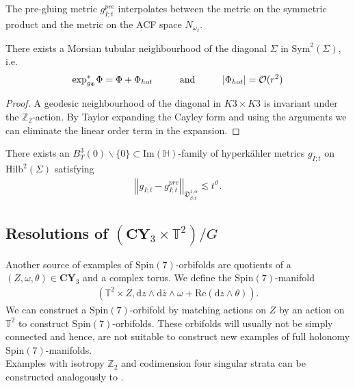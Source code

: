 \documentclass[psamsfonts]{amsart}
\theoremstyle{plain}
\theoremstyle{definition}{
\newtheorem{defi}{Definition}[section]
\newtheorem{ass}{Assumption}
\newtheorem*{nota}{Notation}}
\theoremstyle{remark}{
\newtheorem{rem}{Remark}
\newtheorem{ex}{Example}}
\theoremstyle{plain}{
\newtheorem{thm}{Theorem}[section]
\newtheorem{lem}{Lemma}[section]
\newtheorem{cor}{Corollary}[section]
\newtheorem{prop}{Proposition}[section]
\newtheorem{con}{Conjecture}[section]}
\newcommand{\m}[1]{{\mathrm{#1}}}
\newcommand{\cat}[1]{\textbf{#1}}
\newcommand{\und}[1]{\hspace{#1}\text{and}\hspace{#1}}
\begin{document}
The pre-gluing metric $g^{pre}_{I;t}$ interpolates between the metric on the symmetric product and the metric on the ACF space $N_{\omega_I}$.

\begin{prop}\cite[Cor. 3.9]{joyce2017new}
There exists a Morsian tubular neighbourhood of the diagonal $\Sigma$ in $\m{Sym}^2(\Sigma)$, i.e.
\begin{align*}
    \m{exp}_{g_\Phi}^*\Phi=\Phi+\Phi_{hot}\und{1.0cm}|\Phi_{hot}|=\mathcal{O}(r^2)
\end{align*}
\end{prop}

\begin{proof}
A geodesic neighbourhood of the diagonal in $K3\times K3$ is invariant under the $\mathbb{Z}_2$-action. By Taylor expanding the Cayley form and using the arguments \cite[Chap. 3.4]{joyce2017new} we can eliminate the linear order term in the expansion.
\end{proof}

\begin{prop}
There exists an  $B^3_T(0)\backslash\{0\}\subset\m{Im}(\mathbb{H})$-family of hyperkähler metrics $g_{I;t}$ on $\m{Hilb}^2(\Sigma)$ satisfying 
\begin{align*}
    \left|\left|g_{I;t}-g^{pre}_{I;t}\right|\right|_{\mathfrak{D}^{1,\alpha}_{\beta;t}}\lesssim t^{\vartheta}.
\end{align*}
\end{prop}

\subsection{Resolutions of $(\cat{CY}_3\times\mathbb{T}^2)/G$}
\label{Resolutions of CY3T2}

Another source of examples of $\m{Spin}(7)$-orbifolds are quotients of a $(Z,\omega,\theta)\in\cat{CY}_3$ and a complex torus. We define the $\m{Spin}(7)$-manifold 
\begin{align*}
    (\mathbb{T}^2\times Z, \m{d}z\wedge\m{d}\overline{z}\wedge\omega +\m{Re}(\m{d}z\wedge\theta)).
\end{align*}
We can construct a $\m{Spin}(7)$-orbifold by matching actions on $Z$ by an action on $\mathbb{T}^2$ to construct $\m{Spin}(7)$-orbifolds. These orbifolds will usually not be simply connected and hence, are not suitable to construct new examples of full holonomy $\m{Spin}(7)$-manifolds.\\

Examples with isotropy $\mathbb{Z}_2$ and codimension four singular strata can be constructed analogously to \cite[Chap. 7.4]{joyce2017new}.
\end{document}

